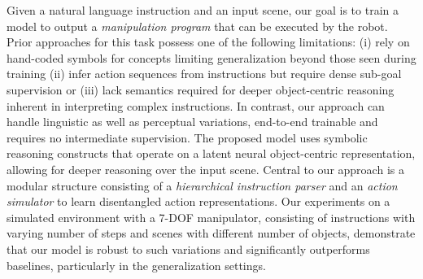 Given a natural language instruction and an input scene, our goal is to train a model %
to output a \emph{manipulation program} that can be executed by the robot.
%
%
Prior approaches for this task possess one of the following limitations: (i) rely on hand-coded symbols for concepts limiting generalization beyond those seen during training (ii) infer action sequences from instructions but require dense sub-goal supervision or (iii) 
lack semantics required for deeper object-centric reasoning inherent in interpreting complex instructions.
%
%
%
In contrast, our approach can handle linguistic as well as perceptual variations, end-to-end trainable and requires no intermediate supervision. The proposed model uses symbolic reasoning constructs that operate on a latent neural object-centric representation, allowing for deeper reasoning over the input scene.
%
Central to our approach is a modular structure  consisting of a {\em hierarchical instruction parser} and an {\em  action simulator} to learn  disentangled action representations.
%
%
%
Our experiments on a simulated environment with a 7-DOF manipulator, consisting of instructions with varying number of steps and scenes with different number of objects,  demonstrate that our model is robust to such variations and significantly outperforms baselines, particularly in the generalization settings.


